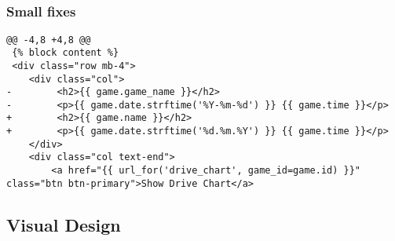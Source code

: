 \begin{verbatim}
	
\end{verbatim}



\begin{verbatim}
	
\end{verbatim}


\subsubsection{Small fixes}


\begin{verbatim}
@@ -4,8 +4,8 @@
 {% block content %}
 <div class="row mb-4">
	<div class="col">
-        <h2>{{ game.game_name }}</h2>
-        <p>{{ game.date.strftime('%Y-%m-%d') }} {{ game.time }}</p>
+        <h2>{{ game.name }}</h2>
+        <p>{{ game.date.strftime('%d.%m.%Y') }} {{ game.time }}</p>
	</div>
	<div class="col text-end">
		<a href="{{ url_for('drive_chart', game_id=game.id) }}" class="btn btn-primary">Show Drive Chart</a>
\end{verbatim}



\subsection{Visual Design}


